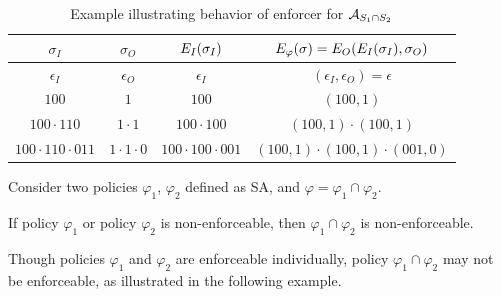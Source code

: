 %
\begin{table}[t]
	\centering
	\scalebox{0.8}
	{
		\begin{tabular}{|c|c|c|c|}
			\hline
			$\sigma_I$ & $\sigma_O$ & $E_{I}(\sigma_I)$ & $E_{\varphi}(\sigma)=E_{O}(E_{I}(\sigma_I), \sigma_O)$ \\
			\hline%
			$\epsilon_I$ & $\epsilon_O$ & $\epsilon_I$ & $(\epsilon_I,\epsilon_O) = \epsilon$\\
			\hline
			$100$ & $1$ & $100$ & $(100,1)$ \\
			\hline
			$100\cdot110$ & $1\cdot1$ & $100\cdot100$ & $(100,1)\cdot(100,1)$ \\
			\hline
			$100\cdot110\cdot011$ & $1\cdot1 \cdot0$ & $100\cdot 100 \cdot 001$ & $(100,1)\cdot(100,1) \cdot(001,0)$ \\
			
			\hline
		\end{tabular}
	}
	\caption{Example illustrating behavior of enforcer for ${\cal A}_{S_1 \cap S_2}$}
	\label{table:EgEnf}
\end{table}


\begin{remark}
	\label{theorem:enforceability-monolithic}
	Consider two policies $\varphi_1$, $\varphi_2$ defined as SA, and $\varphi = \varphi_1 \cap \varphi_2$.
	
	If policy $\varphi_1$  or policy $\varphi_2$ is non-enforceable, then $\varphi_1 \cap \varphi_2$ is non-enforceable.
	
\end{remark}	

\begin{remark}
	Though policies $\varphi_1$ and $\varphi_2$ are enforceable individually, policy $\varphi_1 \cap \varphi_2$ may not be enforceable, as illustrated in the following example.
\end{remark}


